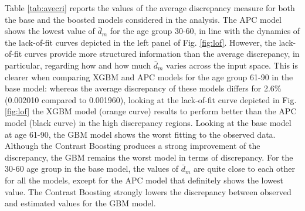 \documentclass[fleqn,10pt]{wlscirep}
\begin{document}
%
Table \ref{tab:avecri} reports the values of the average discrepancy measure for both the base and the boosted models considered in the analysis. 
The APC model shows the lowest value of $\bar{d}_m$ for the age group 30-60, in line with the dynamics of the lack-of-fit curves depicted in the left panel of Fig. \ref{fig:lof}.
However, the lack-of-fit curves provide more structured information than the average discrepancy, in particular, regarding how and how much $\bar{d}_m$ varies across the input space. This is clearer when comparing XGBM and APC models for the age group 61-90 in the base model: whereas the average discrepancy of these models differs for 2.6\% (0.002010 compared to 0.001960), looking at the lack-of-fit curve depicted in Fig. \ref{fig:lof} the XGBM model (orange curve) results to perform better than the APC model (black curve) in the high discrepancy regions. 
Looking at the base model at age 61-90, the GBM model shows the worst fitting to the observed data. Although the Contrast Boosting produces a strong improvement of the discrepancy, the GBM remains the worst model in terms of discrepancy.
For the 30-60 age group in the base model, the values of $\bar{d}_m$ are quite close to each other for all the models, except for the APC model that definitely shows the lowest value.
The Contrast Boosting strongly lowers the discrepancy between observed and estimated values for the GBM model.
%
\end{document}
